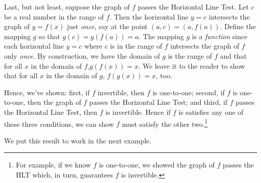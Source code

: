 \documentclass{ximera}
\begin{document}
Last, but not least, suppose the graph of $f$ passes the Horizontal Line Test.  Let  $c$ be a real number in the range of $f$.  Then the horizontal line $y=c$ intersects the graph of $y=f(x)$ just \textit{once}, say at the point $(a,c) = (a, f(a))$.  Define the mapping $g$ so that $g(c) = g(f(a)) = a$.  The mapping $g$ is a \textit{function} since each horizontal line $y=c$ where $c$ is in the range of $f$ intersects the graph of $f$ only \textit{once}.  By construction, we have the domain of $g$ is the range of $f$ and that for all $x$ in the domain of $f$,$g(f(x)) = x$.  We leave it to the reader to show that for all $x$ in the domain of $g$, $f(g(x)) = x$, too.

Hence, we've shown:  first,  if $f$ invertible, then $f$ is one-to-one; second,   if $f$ is one-to-one, then the graph of $f$ passes the Horizontal Line Test; and third,  if $f$ passes the Horizontal Line Test, then $f$ is invertible.  Hence if $f$ is satisfies any one of these three conditions, we can show $f$ must satisfy the other two.\footnote{For example, if we know $f$ is one-to-one, we showed the graph of $f$ passes the HLT which, in turn, guarantees $f$ is invertible.}

We put this result to work in the next example.
\end{document}
